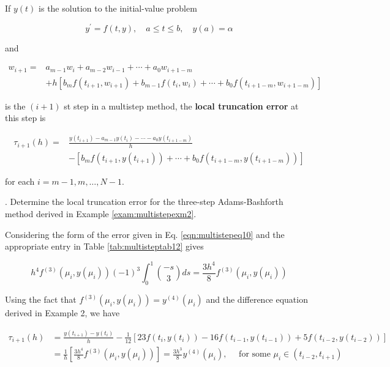 \begin{definition}
If $y(t)$ is the solution to the initial-value problem

$$
y^{\prime}=f(t, y), \quad a \leq t \leq b, \quad y(a)=\alpha
$$

and

$$
\begin{aligned}
w_{i+1}= & a_{m-1} w_{i}+a_{m-2} w_{i-1}+\cdots+a_{0} w_{i+1-m} \\
& +h\left[b_{m} f\left(t_{i+1}, w_{i+1}\right)+b_{m-1} f\left(t_{i}, w_{i}\right)+\cdots+b_{0} f\left(t_{i+1-m}, w_{i+1-m}\right)\right]
\end{aligned}
$$

is the $(i+1)$ st step in a multistep method, the {\bf local truncation error} at this step is

\begin{equation}\label{eqn:multistepeq12}
\begin{split}
\tau_{i+1}(h)= & \frac{y\left(t_{i+1}\right)-a_{m-1} y\left(t_{i}\right)-\cdots-a_{0} y\left(t_{i+1-m}\right)}{h} \\
& -\left[b_{m} f\left(t_{i+1}, y\left(t_{i+1}\right)\right)+\cdots+b_{0} f\left(t_{i+1-m}, y\left(t_{i+1-m}\right)\right)\right]
\end{split}
\end{equation}


for each $i=m-1, m, \ldots, N-1$.
\end{definition}

\begin{example}\label{exam:multistepexm3}.
Determine the local truncation error for the three-step Adams-Bashforth method derived in Example \ref{exam:multistepexm2}.
\end{example}

\begin{mysolution}
Considering the form of the error given in Eq. \ref{eqn:multistepeq10} and the appropriate entry in Table \ref{tab:multisteptab12} gives

$$
h^{4} f^{(3)}\left(\mu_{i}, y\left(\mu_{i}\right)\right)(-1)^{3} \int_{0}^{1}\binom{-s}{3} d s=\frac{3 h^{4}}{8} f^{(3)}\left(\mu_{i}, y\left(\mu_{i}\right)\right)
$$

Using the fact that $f^{(3)}\left(\mu_{i}, y\left(\mu_{i}\right)\right)=y^{(4)}\left(\mu_{i}\right)$ and the difference equation derived in Example 2, we have

$$
\begin{aligned}
\tau_{i+1}(h) & =\frac{y\left(t_{i+1}\right)-y\left(t_{i}\right)}{h}-\frac{1}{12}\left[23 f\left(t_{i}, y\left(t_{i}\right)\right)-16 f\left(t_{i-1}, y\left(t_{i-1}\right)\right)+5 f\left(t_{i-2}, y\left(t_{i-2}\right)\right)\right] \\
& =\frac{1}{h}\left[\frac{3 h^{4}}{8} f^{(3)}\left(\mu_{i}, y\left(\mu_{i}\right)\right)\right]=\frac{3 h^{3}}{8} y^{(4)}\left(\mu_{i}\right), \quad \text { for some } \mu_{i} \in\left(t_{i-2}, t_{i+1}\right)
\end{aligned}
$$
\end{mysolution}

